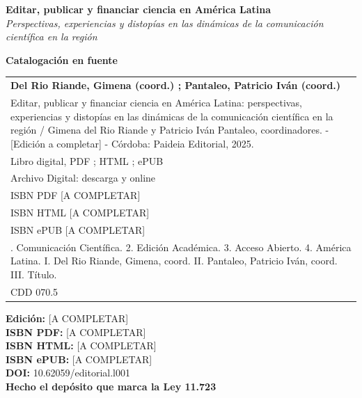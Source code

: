 \thispagestyle{empty}

\vspace*{2cm}

\begin{center}
\textbf{\Large Editar, publicar y financiar ciencia en América Latina}\\[0.5em]
\textit{\large Perspectivas, experiencias y distopías en las dinámicas de la comunicación científica en la región}\\[2em]
\end{center}

\noindent\textbf{Catalogación en fuente}\\[0.5em]

\begin{small}
\begin{tabular}{|p{12cm}|}
\hline
\textbf{Del Rio Riande, Gimena (coord.) ; Pantaleo, Patricio Iván (coord.)} \\
\quad Editar, publicar y financiar ciencia en América Latina: perspectivas, experiencias y distopías en las dinámicas de la comunicación científica en la región / Gimena del Rio Riande y Patricio Iván Pantaleo, coordinadores. - [Edición a completar] - Córdoba: Paideia Editorial, 2025. \\
\quad Libro digital, PDF ; HTML ; ePUB \\[0.5em]
\quad Archivo Digital: descarga y online \\
\quad ISBN PDF [A COMPLETAR] \\
\quad ISBN HTML [A COMPLETAR] \\
\quad ISBN ePUB [A COMPLETAR] \\[0.5em]
\quad 1. Comunicación Científica. 2. Edición Académica. 3. Acceso Abierto. 4. América Latina. I. Del Rio Riande, Gimena, coord. II. Pantaleo, Patricio Iván, coord. III. Título. \\
\quad CDD 070.5 \\
\hline
\end{tabular}
\end{small}

\vspace{1cm}

\noindent\textbf{Edición:} [A COMPLETAR]\\
\textbf{ISBN PDF:} [A COMPLETAR]\\
\textbf{ISBN HTML:} [A COMPLETAR]\\
\textbf{ISBN ePUB:} [A COMPLETAR]\\
\textbf{DOI:} 10.62059/editorial.l001\\
\textbf{Hecho el depósito que marca la Ley 11.723}\\[1em]

